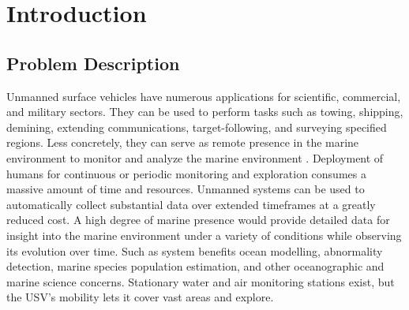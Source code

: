 \documentclass{tamuccthesis}
\begin{document}
\newcommand{\thesistitle}{First Line of Title\\Second Line of Title}	
\newcommand{\authorsname}{Evan Krell}	
\newcommand{\thesismonth}{December 2018} 
\newcommand{\committeechair}{Dr. Scott A. King}
\newcommand{\committeemembera}{Dr. Luis Garcia}
\newcommand{\committeememberb}{Dr. Alaa Sheta}

\maketitlepage
\approval



\tableofcontents
\setlength{\headheight}{36pt}
\listoftables
\listoffigures
\clearpage
\pagestyle{myheadings} 

\setlength{\headheight}{12pt}

\chapter{Introduction}



\section{Problem Description}

Unmanned surface vehicles have numerous applications for scientific, commercial, and military sectors. They can be used to perform tasks such as towing, shipping, demining, extending communications, target-following, and surveying specified regions. Less concretely, they can serve as remote presence in the marine environment to monitor and analyze the marine environment \cite{manley2008unmanned}. Deployment of humans for continuous or periodic monitoring and exploration consumes a massive amount of time and resources. Unmanned systems can be used to automatically collect substantial data over extended timeframes at a greatly reduced cost. A high degree of marine presence would provide detailed data for insight into the marine environment under a variety of conditions while observing its evolution over time. Such as system benefits ocean modelling, abnormality detection, marine species population estimation, and other oceanographic and marine science concerns. Stationary water and air monitoring stations exist, but the USV's mobility lets it cover vast areas and explore. 
\end{document}
